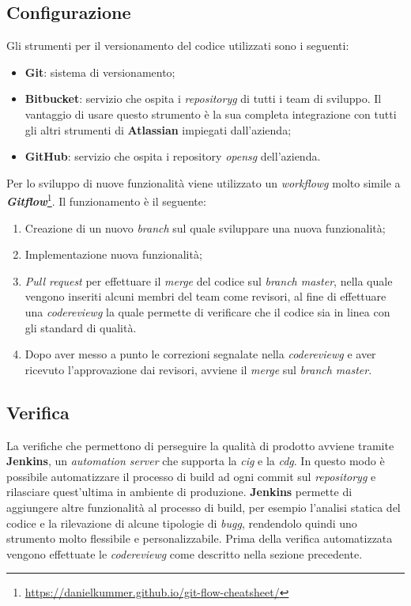 \subsection{Configurazione}
Gli strumenti per il versionamento del codice utilizzati sono i seguenti:
\begin{itemize}
    \item \textbf{Git}: sistema di versionamento;
    \item \textbf{Bitbucket}: servizio che ospita i \textit{\gls{repositoryg}} di tutti i team di sviluppo. Il vantaggio di usare questo strumento è la sua completa integrazione con tutti gli altri strumenti di \textbf{Atlassian} impiegati dall'azienda;
    \item \textbf{GitHub}: servizio che ospita i repository \textit{\gls{opensg}} dell'azienda.
\end{itemize}
Per lo sviluppo di nuove funzionalità viene utilizzato un \textit{\gls{workflowg}} molto simile a \textbf{\textit{Gitflow}}\footnote{\url{https://danielkummer.github.io/git-flow-cheatsheet/}}. Il funzionamento è il seguente:
\begin{enumerate}
    \item Creazione di un nuovo \textit{branch} sul quale sviluppare una nuova funzionalità;
    \item Implementazione nuova funzionalità;
    \item \textit{Pull request} per effettuare il \textit{merge} del codice sul \textit{branch master}, nella quale vengono inseriti alcuni membri del team come revisori, al fine di effettuare una \textit{\gls{codereviewg}} la quale permette di verificare che il codice sia in linea con gli standard di qualità.
    \item Dopo aver messo a punto le correzioni segnalate nella \textit{\gls{codereviewg}} e aver ricevuto l'approvazione dai revisori, avviene il \textit{merge} sul \textit{branch master}.
\end{enumerate}

\subsection{Verifica}
La verifiche che permettono di perseguire la qualità di prodotto avviene tramite \textbf{Jenkins}, un \textit{automation server} che supporta la \textit{\gls{cig}} e la \textit{\gls{cdg}}.
In questo modo è possibile automatizzare il processo di build ad ogni commit sul \textit{\gls{repositoryg}} e rilasciare quest'ultima in ambiente di produzione.
\textbf{Jenkins} permette di aggiungere altre funzionalità al processo di build, per esempio l'analisi statica del codice e la rilevazione di alcune tipologie di \textit{\gls{bugg}}, rendendolo quindi uno strumento molto flessibile e personalizzabile.
Prima della verifica automatizzata vengono effettuate le \textit{\gls{codereviewg}} come descritto nella sezione precedente.
